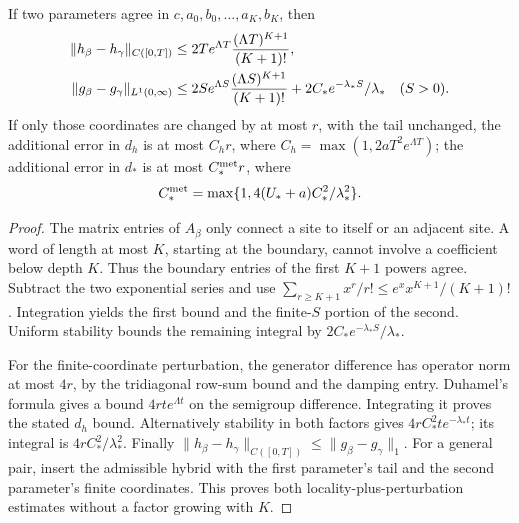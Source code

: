 \begin{lemma}
\label{lem:jacobi-boundary-locality}
If two parameters agree in \(c,a_0,b_0,\ldots,a_K,b_K\), then
\begin{align}
 \|h_\beta-h_\gamma\|_{C([0,T])}
 &\le2T e^{\Lambda T}\frac{(\Lambda T)^{K+1}}{(K+1)!},\notag\\
 \|g_\beta-g_\gamma\|_{L^1(0,\infty)}
 &\le2S e^{\Lambda S}\frac{(\Lambda S)^{K+1}}{(K+1)!}
       +2C_*e^{-\lambda_*S}/\lambda_*\quad(S>0).
 \label{eq:factorial-boundary-locality}
\end{align}
If only those coordinates are changed by at most \(r\), with the tail
unchanged, the additional error in \(d_h\) is at most
\(C_hr\), where \(C_h=\max(1,2aT^2e^{\Lambda T})\); the additional
error in \(d_*\) is at most \(C_*^{\rm met}r\), where
\[
 C_*^{\rm met}=\max\{1,4(U_*+a)C_*^2/\lambda_*^2\}.
\]
\end{lemma}
\begin{proof}
The matrix entries of \(A_\beta\) only connect a site to itself or an
adjacent site. A word of length at most \(K\), starting at the boundary,
cannot involve a coefficient below depth \(K\). Thus the boundary
entries of the first \(K+1\) powers agree. Subtract the two exponential
series and use
\(\sum_{r\ge K+1}x^r/r!\le e^x x^{K+1}/(K+1)!\).
Integration yields the first bound and the finite-\(S\) portion of the
second. Uniform stability bounds the remaining integral by
\(2C_*e^{-\lambda_*S}/\lambda_*\).

For the finite-coordinate perturbation, the generator difference has
operator norm at most \(4r\), by the tridiagonal row-sum bound and the
damping entry. Duhamel's formula gives a bound \(4rte^{\Lambda t}\)
on the semigroup difference. Integrating it proves the stated \(d_h\)
bound. Alternatively stability in both factors gives
\(4rC_*^2te^{-\lambda_*t}\); its integral is
\(4rC_*^2/\lambda_*^2\). Finally
\(\|h_\beta-h_\gamma\|_{C([0,T])}\le\|g_\beta-g_\gamma\|_1\).
For a general pair, insert the admissible hybrid with the first parameter's
tail and the second parameter's finite coordinates. This proves both
locality-plus-perturbation estimates without a factor growing with \(K\).
\end{proof}

